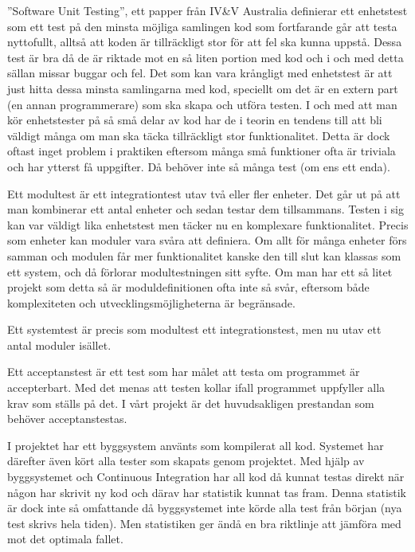 	''Software Unit Testing'', ett papper från IV\&V Australia definierar ett enhetstest som ett test på den minsta möjliga samlingen kod som fortfarande går att testa nyttofullt, alltså att koden är tillräckligt stor för att fel ska kunna uppstå. Dessa test är bra då de är riktade mot en så liten portion med kod och i och med detta sällan missar buggar och fel. Det som kan vara krångligt med enhetstest är att just hitta dessa minsta samlingarna med kod, speciellt om det är en extern part (en annan programmerare) som ska skapa och utföra testen. I och med att man kör enhetstester på så små delar av kod har de i teorin en tendens till att bli väldigt många om man ska täcka tillräckligt stor funktionalitet. Detta är dock oftast inget problem i praktiken eftersom många små funktioner ofta är triviala och har ytterst få uppgifter. Då behöver inte så många test (om ens ett enda). \newline
	
	Ett modultest är ett integrationtest utav två eller fler enheter. Det går ut på att man kombinerar ett antal enheter och sedan testar dem tillsammans. Testen i sig kan var väldigt lika enhetstest men täcker nu en komplexare funktionalitet. Precis som enheter kan moduler vara svåra att definiera. Om allt för många enheter förs samman och modulen får mer funktionalitet kanske den till slut kan klassas som ett system, och då förlorar modultestningen sitt syfte. Om man har ett så litet projekt som detta så är moduldefinitionen ofta inte så svår, eftersom både komplexiteten och utvecklingsmöjligheterna är begränsade. \newline
	
	Ett systemtest är precis som modultest ett integrationstest, men nu utav ett antal moduler isället. 
	
	
	Ett acceptanstest är ett test som har målet att testa om programmet är accepterbart. Med det menas att testen kollar ifall programmet uppfyller alla krav som ställs på det. I vårt projekt är det huvudsakligen prestandan som behöver acceptanstestas.
	
	I projektet har ett byggsystem använts som kompilerat all kod. Systemet har därefter även kört alla tester som skapats genom projektet.
	Med hjälp av byggsystemet och Continuous Integration har all kod då kunnat testas direkt när någon har skrivit ny kod och därav har statistik kunnat tas fram. Denna statistik är dock inte så omfattande då byggsystemet inte körde alla test från början (nya test skrivs hela tiden). Men statistiken ger ändå en bra riktlinje att jämföra med mot det optimala fallet.
	
